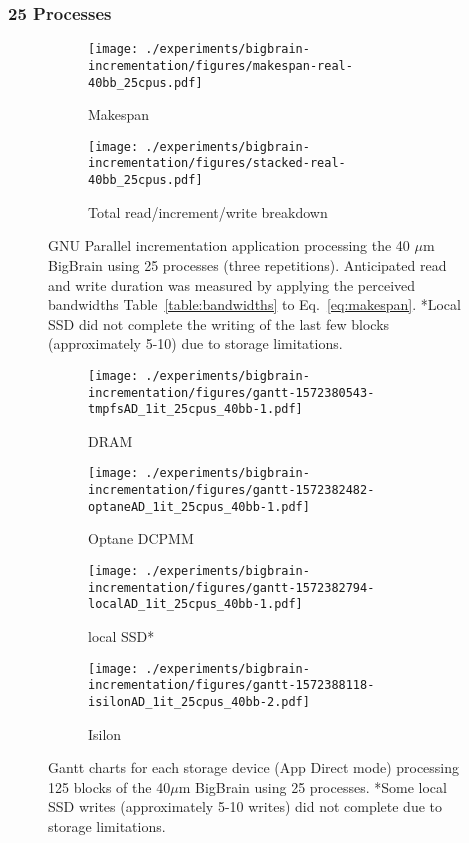 \documentclass[conference]{IEEEtran}
\begin{document}
\subsubsection{25 Processes}


\begin{figure}
    \begin{subfigure}{\columnwidth}
        \centering
        \texttt{[image: ./experiments/bigbrain-incrementation/figures/makespan-real-40bb\_25cpus.pdf]}
        \caption{Makespan}\label{fig:makespan-25cpus}
    \end{subfigure}
    \begin{subfigure}{\columnwidth}
        \centering
        \texttt{[image: ./experiments/bigbrain-incrementation/figures/stacked-real-40bb\_25cpus.pdf]}
        \caption{Total read/increment/write breakdown}\label{fig:stacked-25cpus}
    \end{subfigure}
    \captionsetup{belowskip=-10pt}
    \caption{GNU Parallel incrementation application processing the 40 $\mu$m BigBrain using 25 processes (three repetitions). Anticipated read and write duration was 
    measured by applying the perceived bandwidths Table~\ref{table:bandwidths}
    to Eq.~\ref{eq:makespan}. *Local SSD did not complete the
    writing of the last few blocks (approximately 5-10) due to storage limitations.}
\end{figure}

\begin{figure*}
    \begin{subfigure}{\columnwidth}
        \centering
    \texttt{[image: ./experiments/bigbrain-incrementation/figures/gantt-1572380543-tmpfsAD\_1it\_25cpus\_40bb-1.pdf]}
    \caption{DRAM}
\end{subfigure}
\begin{subfigure}{\columnwidth}
        \centering
    \texttt{[image: ./experiments/bigbrain-incrementation/figures/gantt-1572382482-optaneAD\_1it\_25cpus\_40bb-1.pdf]}
    \caption{Optane DCPMM}
\end{subfigure}
\begin{subfigure}{\columnwidth}
        \centering
    \texttt{[image: ./experiments/bigbrain-incrementation/figures/gantt-1572382794-localAD\_1it\_25cpus\_40bb-1.pdf]}
    \caption{local SSD*}
\end{subfigure}
\begin{subfigure}{\columnwidth}
        \centering
    \texttt{[image: ./experiments/bigbrain-incrementation/figures/gantt-1572388118-isilonAD\_1it\_25cpus\_40bb-2.pdf]}
    \caption{Isilon}\label{fig:gantt25isilon}
\end{subfigure}
    \captionsetup{belowskip=-10pt}
    \caption{Gantt charts for each storage device (App Direct mode) processing 125 blocks of the 40$\mu$m BigBrain using 25 processes. *Some local SSD writes (approximately 5-10 writes) did not complete due to storage limitations.}\label{fig:gantt25}
\end{figure*}
\end{document}
